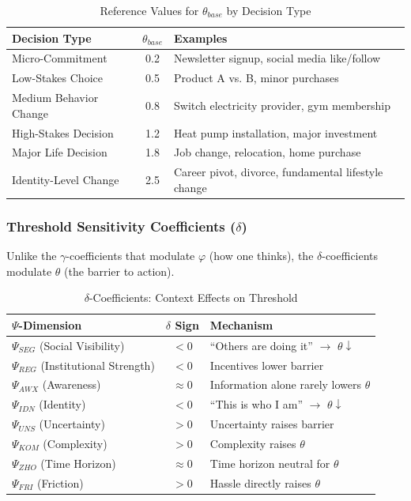 \begin{table}[htbp]
\centering
\caption{Reference Values for $\theta_{base}$ by Decision Type}
\label{tab:theta-base}
\begin{tabular}{@{}lcp{5cm}@{}}
\toprule
\textbf{Decision Type} & $\theta_{base}$ & \textbf{Examples} \\
\midrule
Micro-Commitment & 0.2 & Newsletter signup, social media like/follow \\
Low-Stakes Choice & 0.5 & Product A vs. B, minor purchases \\
Medium Behavior Change & 0.8 & Switch electricity provider, gym membership \\
High-Stakes Decision & 1.2 & Heat pump installation, major investment \\
Major Life Decision & 1.8 & Job change, relocation, home purchase \\
Identity-Level Change & 2.5 & Career pivot, divorce, fundamental lifestyle change \\
\bottomrule
\end{tabular}
\end{table}

\subsubsection{Threshold Sensitivity Coefficients ($\delta$)}

Unlike the $\gamma$-coefficients that modulate $\varphi$ (how one thinks), the $\delta$-coefficients modulate $\theta$ (the barrier to action).

\begin{table}[htbp]
\centering
\caption{$\delta$-Coefficients: Context Effects on Threshold}
\label{tab:delta-coefficients}
\begin{tabular}{@{}lcl@{}}
\toprule
\textbf{$\Psi$-Dimension} & \textbf{$\delta$ Sign} & \textbf{Mechanism} \\
\midrule
$\Psi_{SEG}$ (Social Visibility) & $< 0$ & ``Others are doing it'' $\rightarrow$ $\theta \downarrow$ \\
$\Psi_{REG}$ (Institutional Strength) & $< 0$ & Incentives lower barrier \\
$\Psi_{AWX}$ (Awareness) & $\approx 0$ & Information alone rarely lowers $\theta$ \\
$\Psi_{IDN}$ (Identity) & $< 0$ & ``This is who I am'' $\rightarrow$ $\theta \downarrow$ \\
$\Psi_{UNS}$ (Uncertainty) & $> 0$ & Uncertainty raises barrier \\
$\Psi_{KOM}$ (Complexity) & $> 0$ & Complexity raises $\theta$ \\
$\Psi_{ZHO}$ (Time Horizon) & $\approx 0$ & Time horizon neutral for $\theta$ \\
$\Psi_{FRI}$ (Friction) & $> 0$ & Hassle directly raises $\theta$ \\
\bottomrule
\end{tabular}
\end{table}

